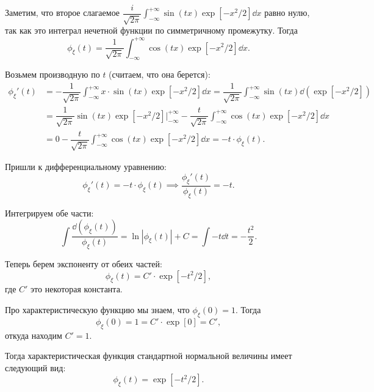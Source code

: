Заметим, что второе слагаемое $\dfrac{i}{\sqrt{2 \pi}} \int_{-\infty}^{+\infty} \sin (tx) \exp[-x^2/2] \dd x$ равно нулю, так как это интеграл нечетной функции по симметричному промежутку. Тогда
\begin{equation*}
    \phi_{\xi}(t) 
    = \dfrac{1}{\sqrt{2 \pi}} \int_{-\infty}^{+\infty} \cos (tx) \exp[-x^2/2] \dd x.
\end{equation*}

Возьмем производную по $t$ (считаем, что она берется):
\begin{align*}
    \phi_{\xi}'(t)
    &= -\dfrac{1}{\sqrt{2 \pi}} \int_{-\infty}^{+\infty} x \cdot \sin (tx) \exp[-x^2/2] \dd x
    = \dfrac{1}{\sqrt{2 \pi}} \int_{-\infty}^{+\infty} \sin (tx) \dd (\exp[-x^2/2]) \\
    &= \dfrac{1}{\sqrt{2 \pi}} \sin (tx) \exp[-x^2/2]\Big|_{-\infty}^{+\infty} - \dfrac{t}{\sqrt{2\pi}} \int_{-\infty}^{+\infty} \cos (tx) \exp[-x^2/2] \dd x \\
    &= 0 - \dfrac{t}{\sqrt{2\pi}} \int_{-\infty}^{+\infty} \cos (tx) \exp[-x^2/2] \dd x
    = -t \cdot \phi_{\xi}(t).
\end{align*}

Пришли к дифференциальному уравнению:
\begin{equation*}
    \phi_{\xi}'(t) = -t \cdot \phi_{\xi}(t) \implies
    \dfrac{\phi_{\xi}'(t)}{\phi_{\xi}(t)} = -t.
\end{equation*}

Интегрируем обе части:
\begin{equation*}
    \int \dfrac{\dd (\phi_{\xi}(t))}{\phi_{\xi}(t)} = \ln |\phi_{\xi}(t)| + C = \int -t \dd t = - \dfrac{t^2}{2}.
\end{equation*}

Теперь берем экспоненту от обеих частей:
\begin{equation*}
    \phi_{\xi}(t) = C' \cdot \exp[-t^2/2],
\end{equation*}
где $C'$ это некоторая константа. 

Про характеристическую функцию мы знаем, что $\phi_{\xi}(0) = 1$. Тогда
\begin{equation*}
    \phi_{\xi}(0) = 1 = C' \cdot \exp[0] = C',
\end{equation*}
откуда находим $C' = 1$.

Тогда характеристическая функция стандартной нормальной величины имеет следующий вид:
\begin{equation*}
    \phi_{\xi}(t) = \exp[-t^2/2].
\end{equation*}

